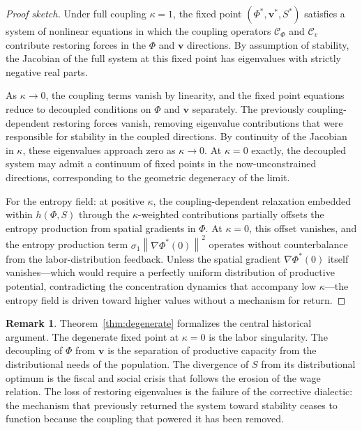 \documentclass[11pt, a4paper]{article}
\theoremstyle{plain}
\theoremstyle{definition}
\newtheorem{remark}[theorem]{Remark}
\newcommand{\Phifield}{\Phi}
\newcommand{\vfield}{\mathbf{v}}
\newcommand{\Sfield}{S}
\newcommand{\coupling}{\kappa}
\newcommand{\norm}[1]{\left\lVert #1 \right\rVert}
\begin{document}
\begin{proof}[Proof sketch]
Under full coupling $\coupling = 1$, the fixed point $(\Phifield^*, \vfield^*,
\Sfield^*)$ satisfies a system of nonlinear equations in which the coupling
operators $\mathcal{C}_\Phi$ and $\mathcal{C}_v$ contribute restoring forces
in the $\Phifield$ and $\vfield$ directions. By assumption of stability, the
Jacobian of the full system at this fixed point has eigenvalues with strictly
negative real parts.

As $\coupling \to 0$, the coupling terms vanish by linearity, and the fixed
point equations reduce to decoupled conditions on $\Phifield$ and $\vfield$
separately. The previously coupling-dependent restoring forces vanish, removing
eigenvalue contributions that were responsible for stability in the coupled
directions. By continuity of the Jacobian in $\coupling$, these eigenvalues
approach zero as $\coupling \to 0$. At $\coupling = 0$ exactly, the decoupled
system may admit a continuum of fixed points in the now-unconstrained
directions, corresponding to the geometric degeneracy of the limit.

For the entropy field: at positive $\coupling$, the coupling-dependent
relaxation embedded within $h(\Phifield, \Sfield)$ through the $\coupling$-weighted
contributions partially offsets the entropy production from spatial gradients
in $\Phifield$. At $\coupling = 0$, this offset vanishes, and the entropy
production term $\sigma_1 \norm{\nabla \Phifield^*(0)}^2$ operates without
counterbalance from the labor-distribution feedback. Unless the spatial gradient
$\nabla \Phifield^*(0)$ itself vanishes---which would require a perfectly uniform
distribution of productive potential, contradicting the concentration dynamics
that accompany low $\coupling$---the entropy field is driven toward higher
values without a mechanism for return.
\end{proof}

\begin{remark}
Theorem~\ref{thm:degenerate} formalizes the central historical argument.
The degenerate fixed point at $\coupling = 0$ is the labor singularity. The
decoupling of $\Phifield$ from $\vfield$ is the separation of productive
capacity from the distributional needs of the population. The divergence of
$\Sfield$ from its distributional optimum is the fiscal and social crisis
that follows the erosion of the wage relation. The loss of restoring
eigenvalues is the failure of the corrective dialectic: the mechanism that
previously returned the system toward stability ceases to function because
the coupling that powered it has been removed.
\end{remark}
\end{document}
